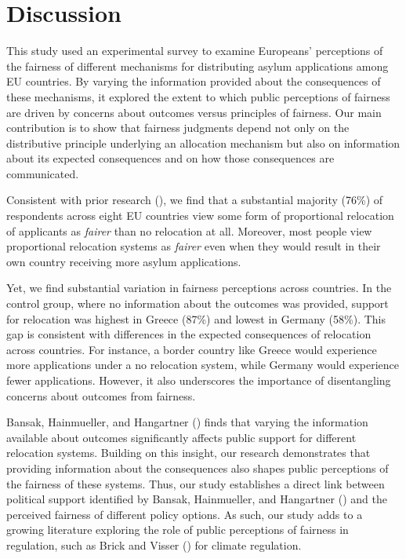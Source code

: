 \documentclass[
  12pt,
  a4paper,
]{article}
\begin{document}
\section{Discussion}\label{discussion}

This study used an experimental survey to examine Europeans' perceptions of the fairness of different mechanisms for distributing asylum applications among EU countries. By varying the information provided about the consequences of these mechanisms, it explored the extent to which public perceptions of fairness are driven by concerns about outcomes versus principles of fairness. Our main contribution is to show that fairness judgments depend not only on the distributive principle underlying an allocation mechanism but also on information about its expected consequences and on how those consequences are communicated.

Consistent with prior research (), we find that a substantial majority (76\%) of respondents across eight EU countries view some form of proportional relocation of applicants as \emph{fairer} than no relocation at all. Moreover, most people view proportional relocation systems as \emph{fairer} even when they would result in their own country receiving more asylum applications.

Yet, we find substantial variation in fairness perceptions across countries. In the control group, where no information about the outcomes was provided, support for relocation was highest in Greece (87\%) and lowest in Germany (58\%). This gap is consistent with differences in the expected consequences of relocation across countries. For instance, a border country like Greece would experience more applications under a no relocation system, while Germany would experience fewer applications. However, it also underscores the importance of disentangling concerns about outcomes from fairness.

Bansak, Hainmueller, and Hangartner () finds that varying the information available about outcomes significantly affects public support for different relocation systems. Building on this insight, our research demonstrates that providing information about the consequences also shapes public perceptions of the fairness of these systems. Thus, our study establishes a direct link between political support identified by Bansak, Hainmueller, and Hangartner () and the perceived fairness of different policy options. As such, our study adds to a growing literature exploring the role of public perceptions of fairness in regulation, such as Brick and Visser () for climate regulation.
\end{document}
